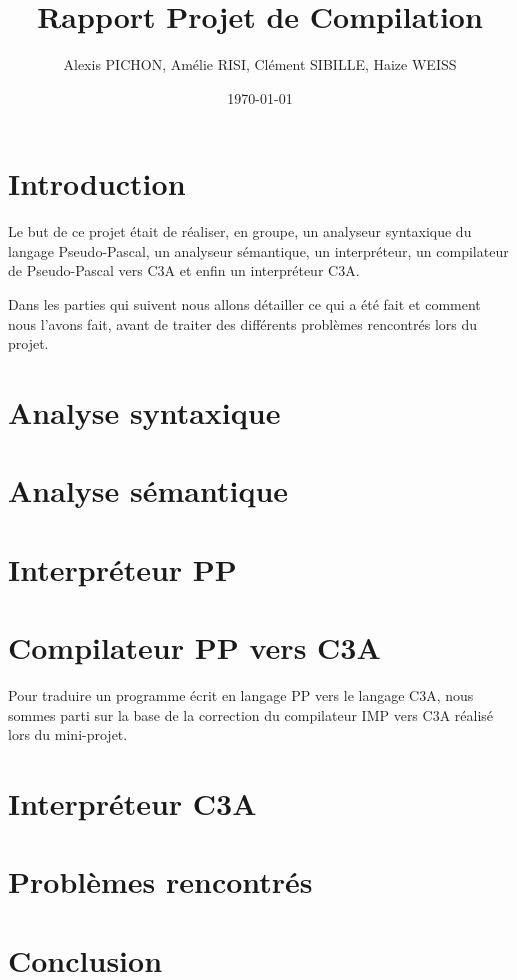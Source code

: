 \documentclass[11pt,a4paper]{article}
\title{Rapport Projet de Compilation}
\author{Alexis PICHON, Amélie RISI, Clément SIBILLE, Haize WEISS}
\date{\today}
\begin{document}
\maketitle
\tableofcontents
\pagebreak

\setlength{\parskip}{1em}
\setlength{\intextsep}{2em}


\section{Introduction}
Le but de ce projet était de réaliser, en groupe, un analyseur syntaxique du langage Pseudo-Pascal, un analyseur sémantique, un interpréteur, un compilateur de Pseudo-Pascal vers C3A et enfin un interpréteur C3A.
\par
Dans les parties qui suivent nous allons détailler ce qui a été fait et comment nous l'avons fait, avant de traiter des différents problèmes rencontrés lors du projet.
\section{Analyse syntaxique}
\section{Analyse sémantique}
\section{Interpréteur PP}
\section{Compilateur PP vers C3A}
Pour traduire un programme écrit en langage PP vers le langage C3A, nous sommes parti sur la base de la correction du compilateur IMP vers C3A réalisé lors du mini-projet.
\section{Interpréteur C3A}
\section{Problèmes rencontrés}
\section{Conclusion}
\end{document}
